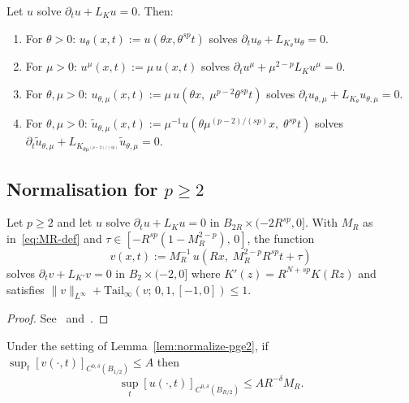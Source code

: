 \documentclass[11pt, a4paper, twoside]{article}
\theoremstyle{definition}
\theoremstyle{remark}
\begin{document}
\begin{lemma}\label{lem:basic-scalings}
Let $u$ solve $\partial_t u + L_K u = 0$. Then:
\begin{enumerate}
\item For $\theta > 0$:
  $u_\theta(x,t) := u(\theta x, \theta^{sp} t)$
  solves
  $\partial_t u_\theta + L_{K_\theta} u_\theta = 0$.

\item For $\mu > 0$:
  $u^\mu(x,t) := \mu\, u(x,t)$
  solves
  $\partial_t u^\mu + \mu^{2-p} L_K u^\mu = 0$.

\item For $\theta, \mu > 0$:
  $u_{\theta,\mu}(x,t)
  := \mu\, u(\theta x,\; \mu^{p-2}\theta^{sp} t)$
  solves
  $\partial_t u_{\theta,\mu}
  + L_{K_\theta} u_{\theta,\mu} = 0$.

\item For $\theta, \mu > 0$:
  $\widetilde{u}_{\theta,\mu}(x,t)
  := \mu^{-1}
     u(\theta\mu^{(p-2)/(sp)} x,\; \theta^{sp} t)$
  solves
  $\partial_t \widetilde{u}_{\theta,\mu}
  + L_{K_{\theta\mu^{(p-2)/(sp)}}}
    \widetilde{u}_{\theta,\mu} = 0$.
\end{enumerate}
\end{lemma}

\subsection*{Normalisation for $p \ge 2$}

\begin{lemma}\label{lem:normalize-pge2}
Let $p \ge 2$ and let $u$ solve $\partial_t u + L_K u = 0$
in $B_{2R} \times (-2R^{sp}, 0]$. With $M_R$ as
in~\eqref{eq:MR-def} and
$\tau \in [-R^{sp}(1-M_R^{2-p}),\,0]$, the function
\[
  v(x,t) := M_R^{-1}\,u\!\left(
    Rx,\; M_R^{2-p}R^{sp}t + \tau\right)
\]
solves $\partial_t v + L_{K'} v = 0$ in $B_2 \times (-2,0]$
where $K'(z) = R^{N+sp}K(Rz)$ and satisfies
$\|v\|_{L^\infty} + \mathrm{Tail}_\infty(v;\,0,1,[-1,0])
\le 1$.
\end{lemma}

\begin{proof}
See~\cite[p.~19]{BrascoLindgrenStromqvist2021}
and~\cite[p.~34]{Tavakoli2024Perturbative}.
\end{proof}

\begin{corollary}\label{cor:holder-transfer-pge2}
Under the setting of Lemma~\ref{lem:normalize-pge2}, if
$\sup_t [v(\cdot,t)]_{C^{0,\delta}(B_{1/2})} \le A$
then \[\sup_t [u(\cdot,t)]_{C^{0,\delta}(B_{R/2})}
\le A R^{-\delta} M_R.\]
\end{corollary}
\end{document}
